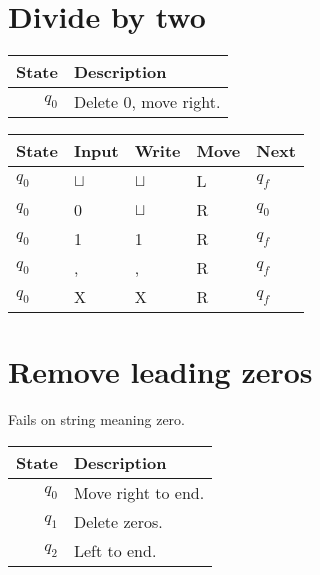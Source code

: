 \documentclass[a4paper, hidelinks, twocolumn, 9pt]{article}
\newcommand{\blm}{\sqcup}
\newcommand{\bl}{\(\blm\)}
\begin{document}
  \section*{Divide by two}
  \begin{tabular}{rl}
    \textbf{State} & \textbf{Description} \\
    \midrule
    \( q_0 \) & Delete 0, move right. \\
  \end{tabular}

  \begin{center}
    \begin{tabular}{x{1cm}x{1cm}x{1cm}x{1cm}x{1cm}}
      \toprule
      State & Input & Write & Move & Next \\
      \midrule
      \(q_0\) & \bl & \bl & L & \(q_f\) \\
      \(q_0\) &   0 & \bl & R & \(q_0\) \\
      \(q_0\) &   1 &   1 & R & \(q_f\) \\
      \(q_0\) &   , &   , & R & \(q_f\) \\
      \(q_0\) &   X &   X & R & \(q_f\) \\
      \bottomrule
    \end{tabular}
  \end{center}
 
  \section*{Remove leading zeros}
  Fails on string meaning zero.

  \begin{tabular}{rl}
    \textbf{State} & \textbf{Description} \\
    \midrule
    \( q_0 \) & Move right to end. \\
    \( q_1 \) & Delete zeros. \\
    \( q_2 \) & Left to end. \\
  \end{tabular}
\end{document}
